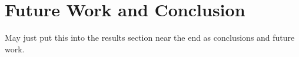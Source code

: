 \chapter{Future Work and Conclusion}

May just put this into the results section near the end as conclusions and future work.